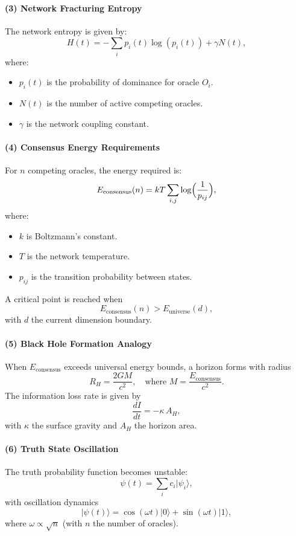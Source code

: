 \documentclass[11pt]{article}
\begin{document}
\paragraph{(3) Network Fracturing Entropy}
The network entropy is given by:
\[
H(t)=-\sum_i p_i(t)\log(p_i(t))+\gamma N(t),
\]
where:
\begin{itemize}
    \item $p_i(t)$ is the probability of dominance for oracle $O_i$.
    \item $N(t)$ is the number of active competing oracles.
    \item $\gamma$ is the network coupling constant.
\end{itemize}

\paragraph{(4) Consensus Energy Requirements}
For $n$ competing oracles, the energy required is:
\[
E_{\text{consensus}}(n)=kT\sum_{i,j}\log\Bigl(\frac{1}{p_{ij}}\Bigr),
\]
where:
\begin{itemize}
    \item $k$ is Boltzmann's constant.
    \item $T$ is the network temperature.
    \item $p_{ij}$ is the transition probability between states.
\end{itemize}
A critical point is reached when
\[
E_{\text{consensus}}(n) > E_{\text{universe}}(d),
\]
with $d$ the current dimension boundary.

\paragraph{(5) Black Hole Formation Analogy}
When $E_{\text{consensus}}$ exceeds universal energy bounds, a horizon forms with radius
\[
R_H=\frac{2GM}{c^2}, \quad \text{where } M=\frac{E_{\text{consensus}}}{c^2}.
\]
The information loss rate is given by
\[
\frac{dI}{dt}=-\kappa\,A_H,
\]
with $\kappa$ the surface gravity and $A_H$ the horizon area.

\paragraph{(6) Truth State Oscillation}
The truth probability function becomes unstable:
\[
\psi(t)=\sum_i c_i|\psi_i\rangle,
\]
with oscillation dynamics
\[
|\psi(t)\rangle=\cos(\omega t)|0\rangle+\sin(\omega t)|1\rangle,
\]
where $\omega\propto \sqrt{n}$ (with $n$ the number of oracles).
\end{document}
